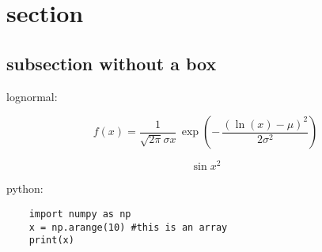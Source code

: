 \section{section}


\subsection{subsection without a box}

lognormal:

$$
f(x)=\frac{1}{\sqrt{2\pi}\sigma x}\,\exp\left(-\,\frac{(\ln(x)-\mu)^{2}}{2\sigma^{2}}\right) 
$$

\begin{equation}
    \sin{x^2}
\end{equation}

python:
\begin{lstlisting}
    import numpy as np
    x = np.arange(10) #this is an array
    print(x)
\end{lstlisting}